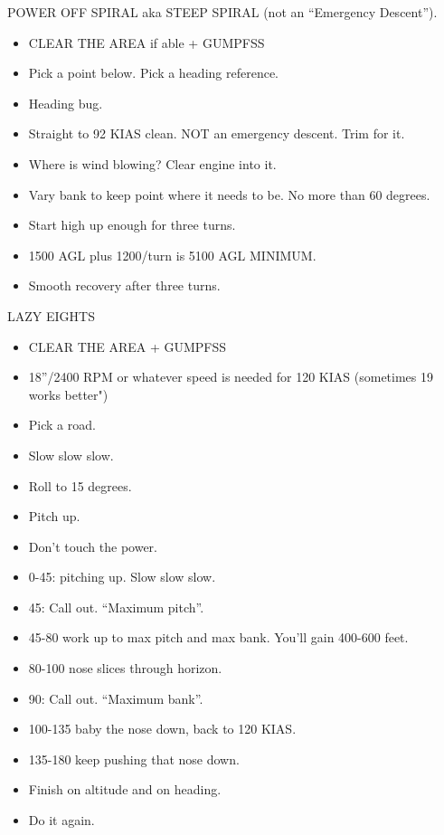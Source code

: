 POWER OFF SPIRAL aka STEEP SPIRAL (not an ``Emergency Descent'').
\begin{itemize}
    \item CLEAR THE AREA if able + GUMPFSS
    \item Pick a point below. Pick a heading reference.
    \item Heading bug.
    \item Straight to 92 KIAS clean. NOT an emergency descent. Trim for it.
    \item Where is wind blowing? Clear engine into it.
    \item Vary bank to keep point where it needs to be. No more than 60 degrees.
    \item Start high up enough for three turns.
    \item 1500 AGL plus 1200/turn is 5100 AGL MINIMUM.
    \item Smooth recovery after three turns.
\end{itemize}

LAZY EIGHTS
\begin{itemize}
    \item CLEAR THE AREA + GUMPFSS
    \item 18”/2400 RPM or whatever speed is needed for 120 KIAS (sometimes 19 works better")
    \item Pick a road.
    \item Slow slow slow.
    \item Roll to 15 degrees.
    \item Pitch up.
    \item Don’t touch the power.
    \item 0-45: pitching up. Slow slow slow.
    \item 45: Call out. ``Maximum pitch''.
    \item 45-80 work up to max pitch and max bank. You’ll gain 400-600 feet.
    \item 80-100 nose slices through horizon.
    \item 90: Call out. ``Maximum bank''.
    \item 100-135 baby the nose down, back to 120 KIAS.
    \item 135-180 keep pushing that nose down.
    \item Finish on altitude and on heading.
    \item Do it again.
\end{itemize}

